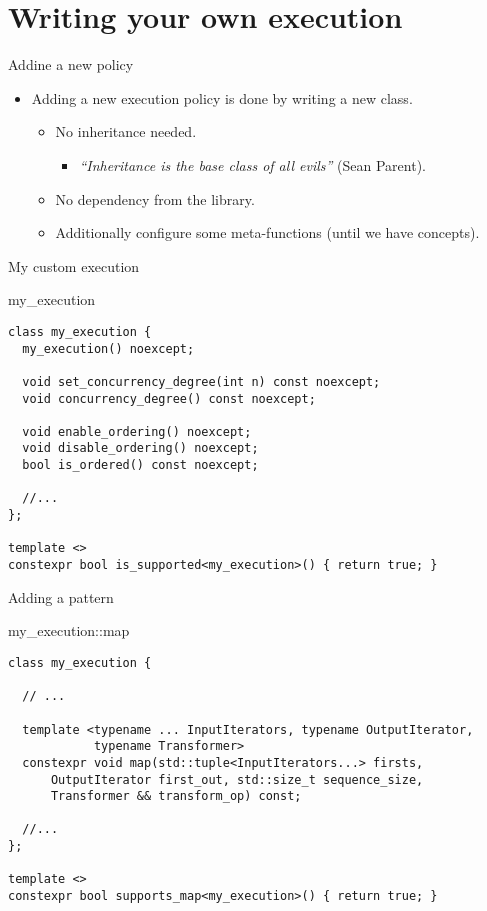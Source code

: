 \section{Writing your own execution}

\begin{frame}[t]{Addine a new policy}
\begin{itemize}
\item Adding a new execution policy is done by writing a new class.
  \begin{itemize}
    \item No inheritance needed.
      \begin{itemize}
        \item \emph{``Inheritance is the base class of all evils''} (Sean Parent).
      \end{itemize}
    \item No dependency from the library.
    \item Additionally configure some meta-functions (until we have concepts).
  \end{itemize}
\end{itemize}
\end{frame}

\begin{frame}[t,fragile]{My custom execution}
\begin{block}{my\_execution}
\begin{lstlisting}
class my_execution {
  my_execution() noexcept;

  void set_concurrency_degree(int n) const noexcept;
  void concurrency_degree() const noexcept;

  void enable_ordering() noexcept;
  void disable_ordering() noexcept;
  bool is_ordered() const noexcept;

  //...
};

template <>
constexpr bool is_supported<my_execution>() { return true; }
\end{lstlisting}
\end{block}
\end{frame}

\begin{frame}[t,fragile]{Adding a pattern}
\begin{block}{my\_execution::map}
\begin{lstlisting}
class my_execution {

  // ...

  template <typename ... InputIterators, typename OutputIterator, 
            typename Transformer>
  constexpr void map(std::tuple<InputIterators...> firsts,
      OutputIterator first_out, std::size_t sequence_size, 
      Transformer && transform_op) const;

  //...
};

template <>
constexpr bool supports_map<my_execution>() { return true; }
\end{lstlisting}
\end{block}
\end{frame}

